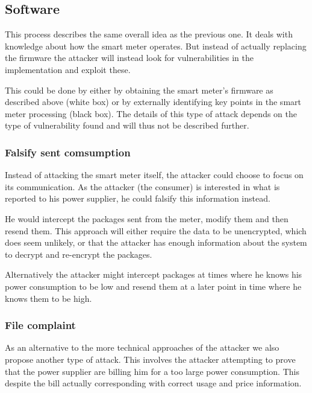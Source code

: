 \subsection{Software}
This process describes the same overall idea as the previous one.
It deals with knowledge about how the smart meter operates.
But instead of actually replacing the firmware the attacker will instead look for vulnerabilities in the implementation and exploit these.

This could be done by either by obtaining the smart meter's firmware as described above (white box) or by externally identifying key points in the smart meter processing (black box).
The details of this type of attack depends on the type of vulnerability found and will thus not be described further.

\subsubsection{Falsify sent comsumption}
Instead of attacking the smart meter itself, the attacker could choose to focus on its communication.
As the attacker (the consumer) is interested in what is reported to his power supplier, he could falsify this information instead.

He would intercept the packages sent from the meter, modify them and then resend them.
This approach will either require the data to be unencrypted, which does seem unlikely, or that the attacker has enough information about the system to decrypt and re-encrypt the packages.

Alternatively the attacker might intercept packages at times where he knows his power consumption to be low and resend them at a later point in time where he knows them to be high.

\subsubsection{File complaint}
As an alternative to the more technical approaches of the attacker we also propose another type of attack.
This involves the attacker attempting to prove that the power supplier are billing him for a too large power consumption.
This despite the bill actually corresponding with correct usage and price information.

